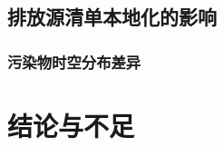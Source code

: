 \documentclass[a4paper]{article}
\begin{document}
\subsection{排放源清单本地化的影响}
\subsubsection{污染物时空分布差异}
\section{结论与不足}
\end{document}
